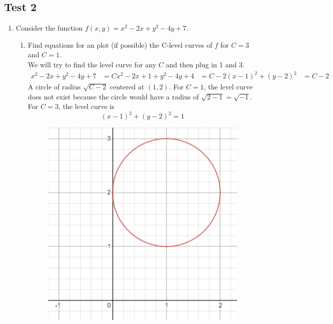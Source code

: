 \subsection{Test 2}
\begin{enumerate}
	\item Consider the function $f(x,y) = x^2 - 2x + y^2 - 4y + 7$.\\
	\begin{enumerate}[label=\alph*.]
		\item Find equations for an plot (if possible) the C-level curves of $f$ for $C = 3$ and $C = 1$.\\
		We will try to find the level curve for any $C$ and then plug in 1 and 3.
		\begin{align*}
			x^2 - 2x + y^2 - 4y + 7 &= C
			x^2 - 2x + 1 + y^2 - 4y + 4 &= C-2
			(x-1)^2 + (y-2)^2 &= C-2			
		\end{align*}
		A circle of radius $\sqrt{C-2}$ centered at $(1,2)$.
		For $C = 1$, the level curve does not exist because the circle would have a radius of $\sqrt{2-1} = \sqrt{-1}$.
		For $C = 3$, the level curve is 
		\begin{equation*}
			(x-1)^2 + (y-2)^2 = 1	
		\end{equation*}
		
		\begin{figure}[H]
			\centering
			\includegraphics[scale=.25]{Images/additionalMaterials/test2_circle}
		\end{figure}
		

\end{enumerate}
\end{enumerate}

